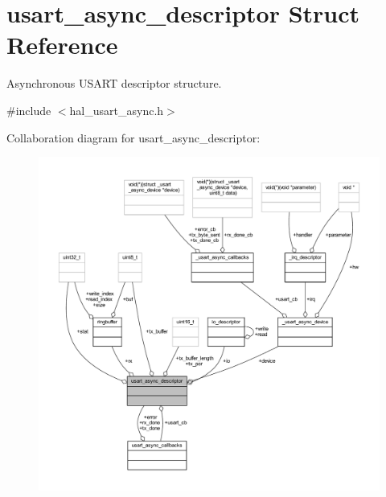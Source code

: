 \hypertarget{structusart__async__descriptor}{}\section{usart\+\_\+async\+\_\+descriptor Struct Reference}
\label{structusart__async__descriptor}


Asynchronous U\+S\+A\+RT descriptor structure.  




{\ttfamily \#include $<$hal\+\_\+usart\+\_\+async.\+h$>$}



Collaboration diagram for usart\+\_\+async\+\_\+descriptor\+:\nopagebreak
\begin{figure}[H]
\begin{center}
\leavevmode
\includegraphics[width=350pt]{structusart__async__descriptor__coll__graph}
\end{center}
\end{figure}
